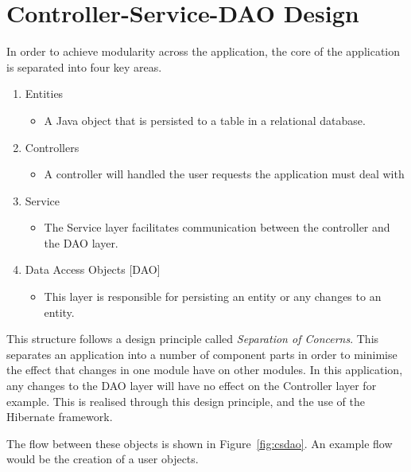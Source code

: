 \label{sec:design}
\section{Controller-Service-DAO Design}

In order to achieve modularity across the application, the core of the application is separated into four key areas.

\begin{enumerate}
\item Entities
\begin{itemize}
\item A Java object that is persisted to a table in a relational database.
\end{itemize}
\item Controllers
\begin{itemize}
\item A controller will handled the user requests the application must deal with
\end{itemize}
\item Service
\begin{itemize}
\item The Service layer facilitates communication between the controller and the DAO layer.
\end{itemize}
\item Data Access Objects [DAO]
\begin{itemize}
\item This layer is responsible for persisting an entity or any changes to an entity.
\end{itemize}
\end{enumerate}
\begin{figure}[H]
\label{fig:appbreakdown}
\end{figure}

This structure follows a design principle called \textit{Separation of Concerns}. This separates an application into a number of component parts in order to minimise the effect that changes in one module have on other modules. In this application, any changes to the DAO layer will have no effect on the Controller layer for example. This is realised through this design principle, and the use of the Hibernate framework.

The flow between these objects is shown in Figure~\ref{fig:csdao}. An example flow would be the creation of a user objects. 

